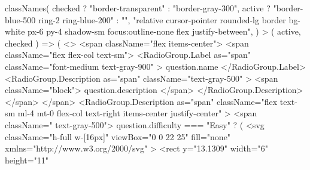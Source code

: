 {{{{{                              classNames(
                                checked
                                  ? "border-transparent"
                                  : "border-gray-300",
                                active
                                  ? "border-blue-500 ring-2 ring-blue-200"
                                  : "",
                                "relative cursor-pointer rounded-lg border bg-white px-6 py-4 shadow-sm focus:outline-none flex justify-between",
                              )
                            }
                          >
                            {({ active, checked }) => (
                              <>
                                <span className="flex items-center">
                                  <span className="flex flex-col text-sm">
                                    <RadioGroup.Label
                                      as="span"
                                      className="font-medium text-gray-900"
                                    >
                                      {question.name}
                                    </RadioGroup.Label>
                                    <RadioGroup.Description
                                      as="span"
                                      className="text-gray-500"
                                    >
                                      <span className="block">
                                        {question.description}
                                      </span>
                                    </RadioGroup.Description>
                                  </span>
                                </span>
                                <RadioGroup.Description
                                  as="span"
                                  className="flex text-sm ml-4 mt-0 flex-col text-right items-center justify-center"
                                >
                                  <span className=" text-gray-500">
                                    {question.difficulty === "Easy" ? (
                                      <svg
                                        className="h-full w-[16px]"
                                        viewBox="0 0 22 25"
                                        fill="none"
                                        xmlns="http://www.w3.org/2000/svg"
                                      >
                                        <rect
                                          y="13.1309"
                                          width="6"
                                          height="11"
}}}}}}
